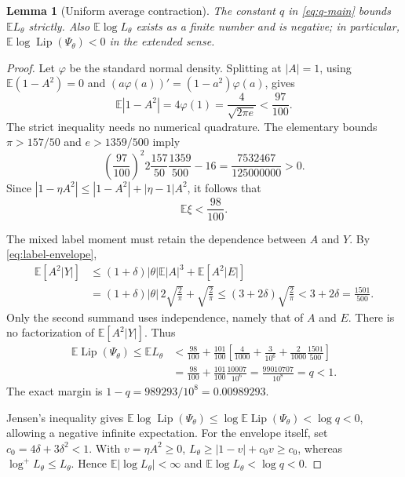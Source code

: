 \documentclass[11pt,a4paper]{article}
\numberwithin{equation}{section}
\newtheorem{lemma}[theorem]{Lemma}
\theoremstyle{remark}
\DeclareMathOperator{\Lip}{Lip}
\newcommand{\E}{\mathbb E}
\begin{document}
\begin{lemma}[Uniform average contraction]\label{lem:contraction}
The constant $q$ in \eqref{eq:q-main} bounds $\E L_\theta$ strictly. Also
$\E\log L_\theta$ exists as a finite number and is negative; in particular,
$\E\log\Lip(\Psi_\theta)<0$ in the extended sense.
\end{lemma}

\begin{proof}
Let $\varphi$ be the standard normal density. Splitting at $|A|=1$,
using $\E(1-A^2)=0$ and $(a\varphi(a))'=(1-a^2)\varphi(a)$, gives
\begin{equation}
 \E|1-A^2|=4\varphi(1)=\frac4{\sqrt{2\pi e}}<\frac{97}{100}.
 \label{eq:normal-identity}
\end{equation}
The strict inequality needs no numerical quadrature. The elementary bounds
$\pi>157/50$ and $e>1359/500$ imply
\begin{equation}
 \left(\frac{97}{100}\right)^2
 2\frac{157}{50}\frac{1359}{500}-16
 =\frac{7532467}{125000000}>0.\label{eq:rational-normal}
\end{equation}
Since $|1-\eta A^2|\le|1-A^2|+|\eta-1|A^2$, it follows that
\begin{equation}
 \E\xi<\frac{98}{100}.\label{eq:xi-first-moment}
\end{equation}

The mixed label moment must retain the dependence between $A$ and $Y$.
By \eqref{eq:label-envelope},
\begin{align}
 \E[A^2|Y|]
 &\le(1+\delta)|\theta|\E|A|^3+\E[A^2|E|]\nonumber\\
 &=(1+\delta)|\theta|\,2\sqrt{\frac2\pi}+\sqrt{\frac2\pi}
 \le(3+2\delta)\sqrt{\frac2\pi}
 <3+2\delta=\frac{1501}{500}.\label{eq:mixed-label}
\end{align}
Only the second summand uses independence, namely that of $A$ and $E$.
There is no factorization of $\E[A^2|Y|]$. Thus
\begin{align}
 \E\Lip(\Psi_\theta)\le\E L_\theta
 &<\frac{98}{100}+\frac{101}{100}
  \left[\frac4{1000}+\frac3{10^6}
             +\frac2{1000}\frac{1501}{500}\right]\nonumber\\
 &=\frac{98}{100}+\frac{101}{100}\frac{10007}{10^6}
 =\frac{99010707}{10^8}=q<1.\label{eq:q-proof}
\end{align}
The exact margin is $1-q=989293/10^8=0.00989293$.

Jensen's inequality gives
$\E\log\Lip(\Psi_\theta)\le\log\E\Lip(\Psi_\theta)<\log q<0$,
allowing a negative infinite expectation. For the envelope itself, set
$c_0=4\delta+3\delta^2<1$. With $v=\eta A^2\ge0$,
$L_\theta\ge|1-v|+c_0v\ge c_0$, whereas
$\log^+L_\theta\le L_\theta$. Hence $\E|\log L_\theta|<\infty$ and
$\E\log L_\theta<\log q<0$.
\end{proof}
\end{document}

